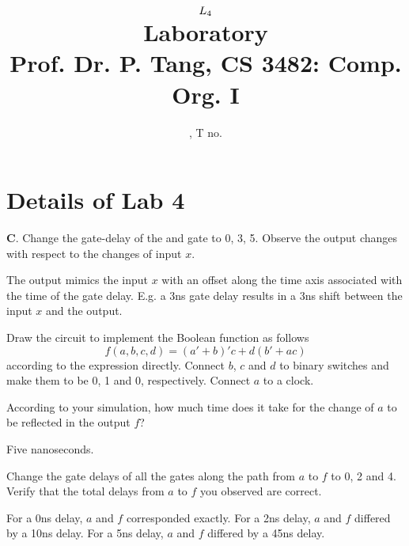 \documentclass[11pt]{article}
\title{
	$L_{4}$ \\
	{\large Laboratory \rom{\lab}} \\
	{\normalsize Prof. Dr. P. Tang, CS 3482: Comp. Org. I}
}
\author{
	\name, T no. \tno
}
\begin{document}
\maketitle

\section{Details of Lab 4}

\begin{question}
	{\bf C}. Change the gate-delay of the {\sc and} gate to 0, 3, 5. Observe the output
	changes with respect to the changes of input $x$.

	The output mimics the input $x$ with an offset along the time axis associated with the time
	of the gate delay. E.g. a 3ns gate delay results in a 3ns shift between the input $x$ and the
	output.
\end{question}

\begin{question}
	Draw the circuit to implement the Boolean function as follows
	\begin{equation}
		\label{eq:booleanexpression}
		f(a,b,c,d) = (a' + b)'c + d(b' + ac)
	\end{equation}
	according to the expression directly.
	Connect $b$, $c$ and $d$ to binary switches and make them to be 0, 1 and 0, respectively.
	Connect $a$ to a clock.

	\begin{subquestion}
		According to your simulation, how much time does it take for the change of $a$ to be
		reflected in the output $f$?

		Five nanoseconds.
	\end{subquestion}

	\begin{subquestion}
		Change the gate delays of all the gates along the path from $a$ to $f$ to 0, 2 and 4.
		Verify that the total delays from $a$ to $f$ you observed are correct.

		For a 0ns delay, $a$ and $f$ corresponded exactly. For a 2ns delay, $a$ and $f$ differed by a 10ns delay.
		For a 5ns delay, $a$ and $f$ differed by a 45ns delay.
	\end{subquestion}


\end{question}
\end{document}
